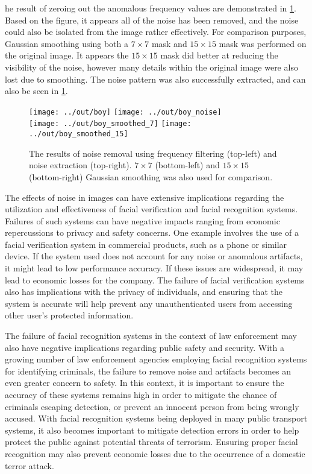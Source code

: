 \documentclass[headings=optiontoheadandtoc,listof=totoc,parskip=full]{scrartcl}
\begin{document}
he result of zeroing out the anomalous frequency values are demonstrated in \cref{fig:boy}. Based on the figure, it appears all of the noise has been removed, and the noise could also be isolated from the image rather effectively. For comparison purposes, Gaussian smoothing using both a $7 \times 7$ mask and $15 \times 15$ mask was performed on the original image. It appears the $15 \times 15$ mask did better at reducing the visibility of the noise, however many details within the original image were also lost due to smoothing. The noise pattern was also successfully extracted, and can also be seen in \cref{fig:boy}.

\begin{figure}[H]
	\centering
	\texttt{[image: ../out/boy]}
	\texttt{[image: ../out/boy\_noise]} \\
	\texttt{[image: ../out/boy\_smoothed\_7]}
	\texttt{[image: ../out/boy\_smoothed\_15]}
	\caption{The results of noise removal using frequency filtering (top-left) and noise extraction (top-right). $7 \times 7$ (bottom-left) and $15 \times 15$ (bottom-right) Gaussian smoothing was also used for comparison.}
	\label{fig:boy}
\end{figure}

The effects of noise in images can have extensive implications regarding the utilization and effectiveness of facial verification and facial recognition systems. Failures of such systems can have negative impacts ranging from economic repercussions to privacy and safety concerns. One example involves the use of a facial verification system in commercial products, such as a phone or similar device. If the system used does not account for any noise or anomalous artifacts, it might lead to low performance accuracy. If these issues are widespread, it may lead to economic losses for the company. The failure of facial verification systems also has implications with the privacy of individuals, and ensuring that the system is accurate will help prevent any unauthenticated users from accessing other user’s protected information.

The failure of facial recognition systems in the context of law enforcement may also have negative implications regarding public safety and security. With a growing number of law enforcement agencies employing facial recognition systems for identifying criminals, the failure to remove noise and artifacts becomes an even greater concern to safety. In this context, it is important to ensure the accuracy of these systems remains high in order to mitigate the chance of criminals escaping detection, or prevent an innocent person from being wrongly accused. With facial recognition systems being deployed in many public transport systems, it also becomes important to mitigate detection errors in order to help protect the public against potential threats of terrorism. Ensuring proper facial recognition may also prevent economic losses due to the occurrence of a domestic terror attack.
\end{document}
